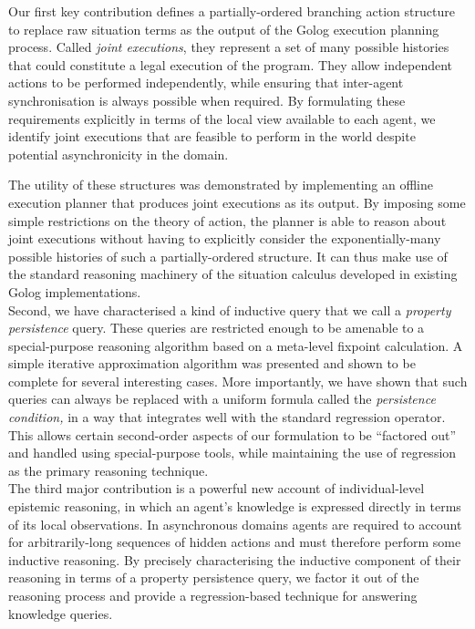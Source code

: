 Our first key contribution defines a partially-ordered branching action
structure to replace raw situation terms as the output of the Golog
execution planning process. Called \emph{joint executions}, they represent
a set of many possible histories that could constitute a legal execution
of the program. They allow independent actions to be performed independently,
while ensuring that inter-agent synchronisation is always possible
when required. By formulating these requirements explicitly in terms
of the local view available to each agent, we identify joint executions
that are feasible to perform in the world despite potential asynchronicity
in the domain.

The utility of these structures was demonstrated by implementing an
offline execution planner that produces joint executions as its output.
By imposing some simple restrictions on the theory of action, the
planner is able to reason about joint executions without having to
explicitly consider the exponentially-many possible histories of such
a partially-ordered structure. It can thus make use of the standard
reasoning machinery of the situation calculus developed in existing
Golog implementations.\\


Second, we have characterised a kind of inductive query that we call
a \emph{property persistence} query. These queries are restricted
enough to be amenable to a special-purpose reasoning algorithm based
on a meta-level fixpoint calculation. A simple iterative approximation
algorithm was presented and shown to be complete for several interesting
cases. More importantly, we have shown that such queries can always
be replaced with a uniform formula called the \emph{persistence condition,}
in a way that integrates well with the standard regression operator.
This allows certain second-order aspects of our formulation to be
{}``factored out'' and handled using special-purpose tools, while
maintaining the use of regression as the primary reasoning technique.\\


The third major contribution is a powerful new account of individual-level
epistemic reasoning, in which an agent's knowledge is expressed directly
in terms of its local observations. In asynchronous domains agents
are required to account for arbitrarily-long sequences of hidden actions
and must therefore perform some inductive reasoning. By precisely
characterising the inductive component of their reasoning in terms
of a property persistence query, we factor it out of the reasoning
process and provide a regression-based technique for answering knowledge
queries.

